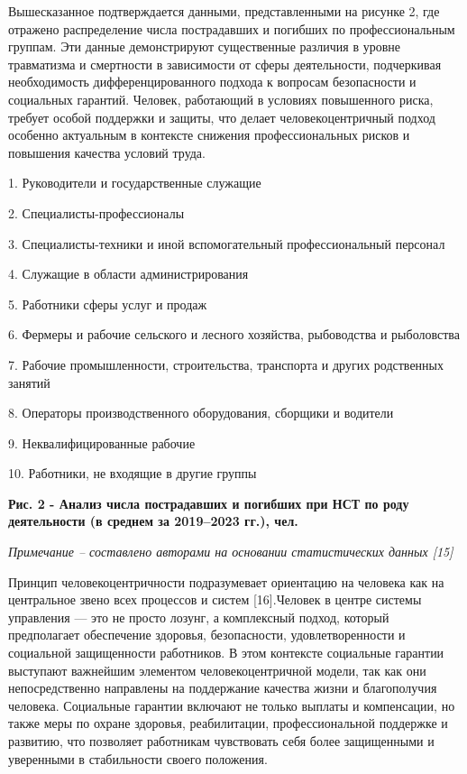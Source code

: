 Вышесказанное подтверждается данными, представленными на рисунке 2, где
отражено распределение числа пострадавших и погибших по профессиональным
группам. Эти данные демонстрируют существенные различия в уровне
травматизма и смертности в зависимости от сферы деятельности,
подчеркивая необходимость дифференцированного подхода к вопросам
безопасности и социальных гарантий. Человек, работающий в условиях
повышенного риска, требует особой поддержки и защиты, что делает
человекоцентричный подход особенно актуальным в контексте снижения
профессиональных рисков и повышения качества условий труда.

1. Руководители и государственные служащие

2. Специалисты-профессионалы

3. Специалисты-техники и иной вспомогательный профессиональный персонал

4. Служащие в области администрирования

5. Работники сферы услуг и продаж

6. Фермеры и рабочие сельского и лесного хозяйства, рыбоводства и
рыболовства

7. Рабочие промышленности, строительства, транспорта и других
родственных занятий

8. Операторы производственного оборудования, сборщики и водители

9. Неквалифицированные рабочие

10. Работники, не входящие в другие группы

{\bfseries Рис. 2 - Анализ числа пострадавших и погибших при НСТ по роду
деятельности (в среднем за 2019--2023 гг.), чел.}

\emph{Примечание -- составлено авторами на основании статистических
данных {[}15{]}}

Принцип человекоцентричности подразумевает ориентацию на человека как на
центральное звено всех процессов и систем {[}16{]}.Человек в центре
системы управления --- это не просто лозунг, а комплексный подход,
который предполагает обеспечение здоровья, безопасности,
удовлетворенности и социальной защищенности работников. В этом контексте
социальные гарантии выступают важнейшим элементом человекоцентричной
модели, так как они непосредственно направлены на поддержание качества
жизни и благополучия человека. Социальные гарантии включают не только
выплаты и компенсации, но также меры по охране здоровья, реабилитации,
профессиональной поддержке и развитию, что позволяет работникам
чувствовать себя более защищенными и уверенными в стабильности своего
положения.

